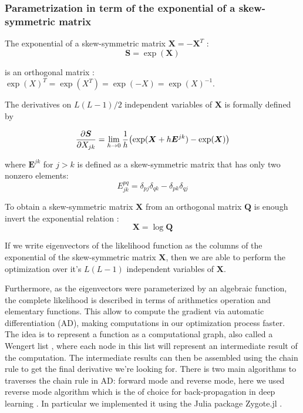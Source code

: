 \documentclass[preprint,amsmath,amssymb,superscriptaddress,showpacs,pre]{revtex4-1}
\let\originalleft\left
\let\originalright\right
\renewcommand{\left}{\mathopen{}\mathclose\bgroup\originalleft}
\renewcommand{\right}{\aftergroup\egroup\originalright}
\begin{document}
\subsubsection{Parametrization in term of the exponential of a skew-symmetric matrix }
The exponential of a skew-symmetric matrix $\bm X=-\bm X^T$  : 
 \begin{equation}
 \bm S=\exp (\bm X)
 \end{equation}
 
 is  an  orthogonal  matrix : $\exp(X)^T=\exp(X^T)=\exp(-X)=\exp(X)^{-1}$. 
 
 The derivatives on $L(L-1)/2$ independent variables of $\bm X$  is formally defined by
 
 \begin{equation}
 \frac{\partial \bm S}{\partial X_{jk}}=\lim_{h\rightarrow 0} \frac{1}{h} \left( \exp(\bm X+ h \bm E^{jk}) - \exp(\bm X)\right) 
 \end{equation}
 
 where $\bm E^{jk}$ for $j > k$ is defined as a skew-symmetric matrix that has only two nonzero elements:
 \begin{equation}
 E^{pq}_{jk}=\delta_{pj}\delta_{qk}-\delta_{pk}\delta_{qj}
 \end{equation}
 
To obtain   a skew-symmetric matrix    $\bm X$ from an orthogonal matrix $\bm Q$    is enough invert the exponential relation :
 $$\bm X=\log \bm Q$$
 
  If we write eigenvectors of the likelihood function as the columns of the exponential of the skew-symmetric matrix $\bm X$, then we are able to perform the optimization over it's $L(L-1)$ independent variables of $\bm X$.
 
 Furthermore, as the eigenvectors were parameterized by an algebraic function, the complete likelihood  is described in terms of arithmetics operation and elementary functions. This allow to compute  the gradient via  automatic differentiation (AD), making computations in our optimization process faster. 
 The idea  is to represent a function as a computational graph, also called a Wengert list , where each node  in this list will represent an intermediate result of the computation. The intermediate results can then be assembled using the chain rule to get the final derivative we’re looking for. There is two    main algorithms  to traverses the chain rule in AD: forward mode and reverse mode, here we used reverse mode  algorithm  which is the of choice for back-propagation in deep learning . In particular we implemented  it using the Julia package Zygote.jl . 
 
\end{document}
